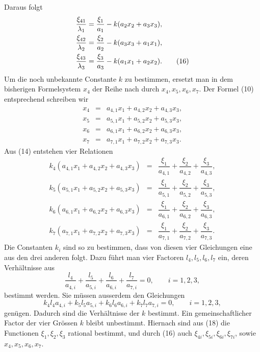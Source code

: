 \documentclass[11pt]{article}
\begin{document}
Daraus folgt
\begin{align}
 \frac{\xi_{41}}{\lambda_1}&=\frac{\xi_1}{a_1}-k(a_2x_2+a_3x_3),\notag\\
 \frac{\xi_{42}}{\lambda_2}&=\frac{\xi_2}{a_2}-k(a_3x_3+a_1x_1),\notag\\
 \frac{\xi_{43}}{\lambda_3}&=\frac{\xi_3}{a_3}-k(a_1x_1+a_2x_2).
 \tag{16}
\end{align}
Um die noch unbekannte Constante \(k\) zu bestimmen, ersetzt man in dem bisherigen Formelsystem \(x_4\) der Reihe nach durch \(x_4,x_5,x_6,x_7\). Der Formel (10) entsprechend schreiben wir
\begin{equation}
\begin{array}{rcl}
 x_4&=&a_{4,1}x_1+a_{4,2}x_2+a_{4,3}x_3,\\
 x_5&=&a_{5,1}x_1+a_{5,2}x_2+a_{5,3}x_3,\\
 x_6&=&a_{6,1}x_1+a_{6,2}x_2+a_{6,3}x_3,\\
 x_7&=&a_{7,1}x_1+a_{7,2}x_2+a_{7,3}x_3.
\end{array}
\tag{17}
\end{equation}
Aus (14) entstehen vier Relationen
\begin{equation}
\begin{array}{rcl}
 k_4(a_{4,1}x_1+a_{4,2}x_2+a_{4,3}x_3)&=&\dfrac{\xi_1}{a_{4,1}}+\dfrac{\xi_2}{a_{4,2}}+\dfrac{\xi_3}{a_{4,3}},\\[0.8em]
 k_5(a_{5,1}x_1+a_{5,2}x_2+a_{5,3}x_3)&=&\dfrac{\xi_1}{a_{5,1}}+\dfrac{\xi_2}{a_{5,2}}+\dfrac{\xi_3}{a_{5,3}},\\[0.8em]
 k_6(a_{6,1}x_1+a_{6,2}x_2+a_{6,3}x_3)&=&\dfrac{\xi_1}{a_{6,1}}+\dfrac{\xi_2}{a_{6,2}}+\dfrac{\xi_3}{a_{6,3}},\\[0.8em]
 k_7(a_{7,1}x_1+a_{7,2}x_2+a_{7,3}x_3)&=&\dfrac{\xi_1}{a_{7,1}}+\dfrac{\xi_2}{a_{7,2}}+\dfrac{\xi_3}{a_{7,3}}.
\end{array}
\tag{18}
\end{equation}
Die Constanten \(k_i\) sind so zu bestimmen, dass von diesen vier Gleichungen eine aus den drei anderen folgt. Dazu führt man vier Factoren \(l_4,l_5,l_6,l_7\) ein, deren Verhältnisse aus
\begin{equation}
 \frac{l_4}{a_{4,i}}+\frac{l_5}{a_{5,i}}+\frac{l_6}{a_{6,i}}+\frac{l_7}{a_{7,i}}=0,
 \qquad i=1,2,3,
 \tag{19}
\end{equation}
bestimmt werden. Sie müssen ausserdem den Gleichungen
\begin{equation}
 k_4l_4a_{4,i}+k_5l_5a_{5,i}+k_6l_6a_{6,i}+k_7l_7a_{7,i}=0,
 \qquad i=1,2,3,
 \tag{20}
\end{equation}
genügen. Dadurch sind die Verhältnisse der \(k\) bestimmt. Ein gemeinschaftlicher Factor der vier Grössen \(k\) bleibt unbestimmt. Hiernach sind aus (18) die Functionen \(\xi_1,\xi_2,\xi_3\) rational bestimmt, und durch (16) auch \(\xi_{4i},\xi_{5i},\xi_{6i},\xi_{7i}\), sowie \(x_4,x_5,x_6,x_7\).
\end{document}

